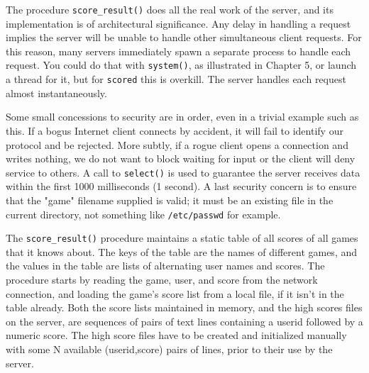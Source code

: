 The procedure \texttt{score\_result()} does all the real work of the
server, and its implementation is of architectural significance. Any
delay in handling a request implies the server will be unable to
handle other simultaneous client requests. For this reason, many servers
immediately spawn a separate process to handle each request.
You could do that with \texttt{system()}, as illustrated in Chapter 5,
or launch a thread for it,
but for \texttt{scored} this is overkill. The server handles each
request almost instantaneously.

Some small concessions to security are in order, even in a trivial
example such as this. If a bogus Internet client connects by accident,
it will fail to identify our protocol and be rejected. More subtly, if
a rogue client opens a connection and writes nothing, we do not want to
block waiting for input or the client will deny service to others. A
call to \texttt{select()} is used to guarantee the server receives data within
the first 1000 milliseconds (1 second). A last security concern is to
ensure that the "game" filename supplied is
valid; it must be an existing file in the current directory, not
something like \texttt{/etc/passwd} for example. 

The \texttt{score\_result()} procedure maintains a static table of all
scores of all games that it knows about. The keys of the table are the
names of different games, and the values in the table are lists of
alternating user names and scores. The procedure starts by reading the
game, user, and score from the network connection, and loading the
game's score list from a local file, if it
isn't in the table already. Both the score lists
maintained in memory, and the high scores files on the server, are
sequences of pairs of text lines containing a userid followed by a
numeric score. The high score files have to be created and initialized
manually with some N available (userid,score) pairs of lines, prior to
their use by the server.

